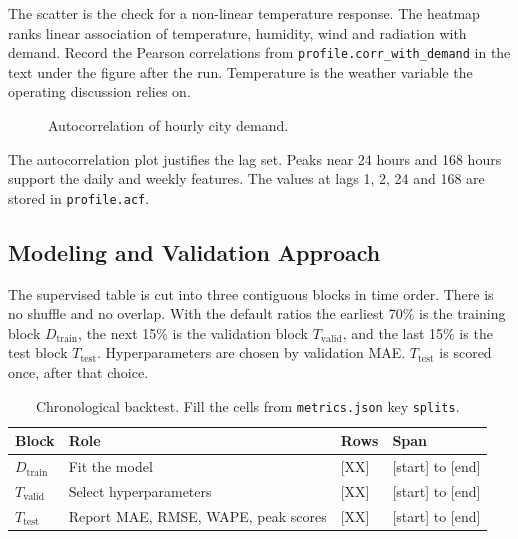The scatter is the check for a non-linear temperature response. The heatmap
ranks linear association of temperature, humidity, wind and radiation with
demand. Record the Pearson correlations from \texttt{profile.corr\_with\_demand}
in the text under the figure after the run. Temperature is the weather
variable the operating discussion relies on.

\begin{figure}[h]
  \centering
  \caption{Autocorrelation of hourly city demand.}
  \label{fig:acf}
\end{figure}

The autocorrelation plot justifies the lag set. Peaks near 24 hours and
168 hours support the daily and weekly features. The values at lags 1, 2, 24
and 168 are stored in \texttt{profile.acf}.

\subsection{Modeling and Validation Approach}
\label{sec:models}

The supervised table is cut into three contiguous blocks in time order. There
is no shuffle and no overlap. With the default ratios the earliest 70\% is
the training block \(D_{\mathrm{train}}\), the next 15\% is the validation
block \(T_{\mathrm{valid}}\), and the last 15\% is the test block
\(T_{\mathrm{test}}\). Hyperparameters are chosen by validation MAE.
\(T_{\mathrm{test}}\) is scored once, after that choice.

\begin{table}[h]
  \centering
  \small
  \begin{tabular}{@{}llll@{}}
    \toprule
    Block & Role & Rows & Span \\
    \midrule
    \(D_{\mathrm{train}}\) & Fit the model & [XX] & [start] to [end] \\
    \(T_{\mathrm{valid}}\) & Select hyperparameters & [XX] & [start] to [end] \\
    \(T_{\mathrm{test}}\) & Report MAE, RMSE, WAPE, peak scores & [XX] & [start] to [end] \\
    \bottomrule
  \end{tabular}
  \caption{Chronological backtest. Fill the cells from \texttt{metrics.json} key \texttt{splits}.}
  \label{tab:splits}
\end{table}

